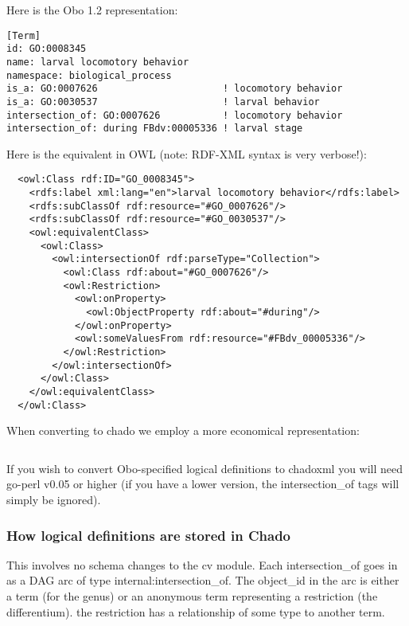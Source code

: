Here is the Obo 1.2 representation:

\begin{verbatim}
[Term]
id: GO:0008345
name: larval locomotory behavior
namespace: biological_process
is_a: GO:0007626                      ! locomotory behavior
is_a: GO:0030537                      ! larval behavior
intersection_of: GO:0007626           ! locomotory behavior
intersection_of: during FBdv:00005336 ! larval stage
\end{verbatim}

Here is the equivalent in OWL (note: RDF-XML syntax is very verbose!):

\begin{verbatim}
  <owl:Class rdf:ID="GO_0008345">
    <rdfs:label xml:lang="en">larval locomotory behavior</rdfs:label>
    <rdfs:subClassOf rdf:resource="#GO_0007626"/>
    <rdfs:subClassOf rdf:resource="#GO_0030537"/>
    <owl:equivalentClass>
      <owl:Class>
        <owl:intersectionOf rdf:parseType="Collection">
          <owl:Class rdf:about="#GO_0007626"/>
          <owl:Restriction>
            <owl:onProperty>
              <owl:ObjectProperty rdf:about="#during"/>
            </owl:onProperty>
            <owl:someValuesFrom rdf:resource="#FBdv_00005336"/>
          </owl:Restriction>
        </owl:intersectionOf>
      </owl:Class>
    </owl:equivalentClass>
  </owl:Class>
\end{verbatim}

When converting to chado we employ a more economical representation:

\begin{verbatim}
\end{verbatim}

If you wish to convert Obo-specified logical definitions to chadoxml
you will need go-perl v0.05 or higher (if you have a lower version,
the intersection\_of tags will simply be ignored). 

\subsubsection{How logical definitions are stored in Chado}

This involves no schema changes to the cv module. Each intersection\_of
goes in as a DAG arc of type internal:intersection\_of. The object_id
in the arc is either a term (for the genus) or an anonymous term
representing a restriction (the differentium). the restriction has a
relationship of some type to another term.

